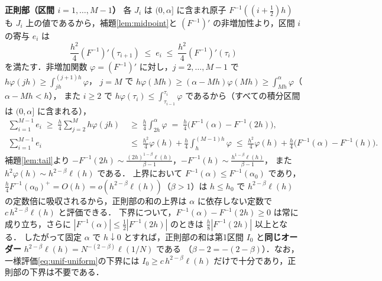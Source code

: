 \documentclass[a4paper,10pt]{jsarticle}
\makeatletter
\theoremstyle{definition}
\renewenvironment{proof}[1][\proofname]{\par
  \pushQED{\qed}%
  \normalfont \topsep6\p@\@plus6\p@\relax
  \trivlist
  \item[\hskip\labelsep\textbf{#1}]\ignorespaces
}{%
  \popQED\endtrivlist\@endpefalse
}
\renewcommand{\proofname}{証明}
\newcommand{\Finv}{F^{-1}}
\makeatother
\begin{document}
\begin{proof}
\noindent\textbf{正則部（区間 $i=1,\dots,M-1$）}
各 $J_i$ は $(0,\alpha]$ に含まれ原子 $\Finv((i+\frac12)h)$ も $J_i$ 上の値であるから，補題\ref{lem:midpoint}と $(\Finv)'$ の非増加性より，区間 $i$ の寄与 $e_i$ は
\begin{equation*}
  \frac{h^2}{4}(\Finv)'(\tau_{i+1})\;\le\;e_i\;\le\;\frac{h^2}{4}(\Finv)'(\tau_i)
\end{equation*}
を満たす．非増加関数 $\varphi=(\Finv)'$ に対し，$j=2,\dots,M-1$ で $h\varphi(jh)\ge\int_{jh}^{(j+1)h}\varphi$，
$j=M$ で $h\varphi(Mh)\ge(\alpha-Mh)\varphi(Mh)\ge\int_{Mh}^{\alpha}\varphi$（$\alpha-Mh<h$），
また $i\ge2$ で $h\varphi(\tau_i)\le\int_{\tau_{i-1}}^{\tau_i}\varphi$ であるから（すべての積分区間は $(0,\alpha]$ に含まれる），
\begin{align*}
\sum_{i=1}^{M-1}e_i\;\ge\;\frac h4\sum_{j=2}^{M}h\varphi(jh)
&\;\ge\;\frac h4\int_{2h}^{\alpha}\varphi\;=\;\frac h4\bigl(\Finv(\alpha)-\Finv(2h)\bigr),\\
\sum_{i=1}^{M-1}e_i
&\;\le\;\frac{h^2}{4}\varphi(h)+\frac h4\int_{h}^{(M-1)h}\varphi\;\le\;\frac{h^2}{4}\varphi(h)+\frac h4\bigl(\Finv(\alpha)-\Finv(h)\bigr).
\end{align*}
補題\ref{lem:tail}より $-\Finv(2h)\sim\frac{(2h)^{1-\beta}\ell(h)}{\beta-1}$，$-\Finv(h)\sim\frac{h^{1-\beta}\ell(h)}{\beta-1}$，
また $h^2\varphi(h)\sim h^{2-\beta}\ell(h)$ である．
上界において $\Finv(\alpha)\le\Finv(\alpha_0)$ であり，$\frac h4\Finv(\alpha_0)^{+}=O(h)=o(h^{2-\beta}\ell(h))$（$\beta>1$）は
$h\le h_0$ で $h^{2-\beta}\ell(h)$ の定数倍に吸収されるから，正則部の和の上界は $\alpha$ に依存しない定数で $c\,h^{2-\beta}\ell(h)$ と評価できる．
下界について，$\Finv(\alpha)-\Finv(2h)\ge0$ は常に成り立ち，さらに $|\Finv(\alpha)|\le\frac12|\Finv(2h)|$ のときは $\frac h8|\Finv(2h)|$ 以上となる．
したがって固定 $\alpha$ で $h\downarrow0$ とすれば，正則部の和は第1区間 $I_0$ と\textbf{同じオーダー} $h^{2-\beta}\ell(h)=N^{-(2-\beta)}\ell(1/N)$ である
（$\beta-2=-(2-\beta)$）．なお，一様評価\eqref{eq:unif-uniform}の下界には $I_0\ge c\,h^{2-\beta}\ell(h)$ だけで十分であり，正則部の下界は不要である．


\end{proof}
\end{document}
